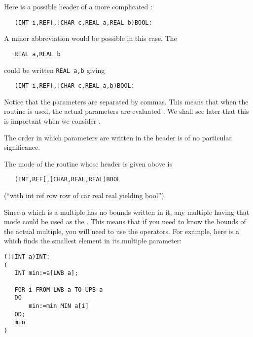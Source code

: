Here is a possible header of a more complicated
:
\begin{verbatim}
   (INT i,REF[,]CHAR c,REAL a,REAL b)BOOL:
\end{verbatim}
\noindent
A minor abbreviation would be possible in this case. The
\begin{verbatim}
   REAL a,REAL b
\end{verbatim}
\noindent
could be written \verb|REAL a,b| giving
\begin{verbatim}
   (INT i,REF[,]CHAR c,REAL a,b)BOOL:
\end{verbatim}
\noindent
Notice that the parameters are separated by commas.  This means that
when the routine is used, the actual parameters are evaluated
.  We shall see later that
this is important when we consider
.

The order in which parameters are written in the header is of no
particular significance.

The mode of the routine whose header is given above is
\begin{verbatim}
   (INT,REF[,]CHAR,REAL,REAL)BOOL
\end{verbatim}
\noindent
(``with int ref row row of car real real yielding bool'').

Since a  which is a multiple
has no bounds written in it, any multiple having that mode could be
used as the . This means that
if you need to know the bounds of the actual multiple, you will need to
use the  operators. For
example, here is a  which
finds the smallest element in its multiple parameter:
\begin{verbatim}
([]INT a)INT:
(
   INT min:=a[LWB a];

   FOR i FROM LWB a TO UPB a
   DO
       min:=min MIN a[i]
   OD;
   min
)
\end{verbatim}

